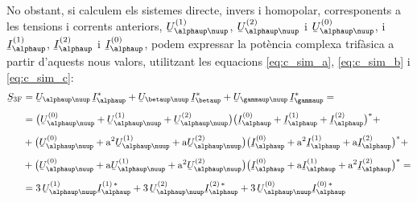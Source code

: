 No obstant, si calculem els sistemes directe, invers i homopolar,
corresponents a les tensions i corrents anteriors,
$\cmplx{U}_{\alphaup\nuup}\ap{(1)}$, $\cmplx{U}_{\alphaup\nuup}\ap{(2)}$ i
$\cmplx{U}_{\alphaup\nuup}\ap{(0)}$, i $\cmplx{I}_\alphaup\ap{(1)}$,
$\cmplx{I}_\alphaup\ap{(2)}$ i $\cmplx{I}_\alphaup\ap{(0)}$, podem
expressar la pot\`{e}ncia complexa trif\`{a}sica a partir d'aquests nous
valors, utilitzant les equacions \eqref{eq:c_sim_a},
\eqref{eq:c_sim_b} i \eqref{eq:c_sim_c}:
\begin{equation}
\begin{split}
   \cmplx{S}\ped{3F} &= \cmplx{U}_{\alphaup\nuup} \,\cmplx{I}_\alphaup^* +
   \cmplx{U}_{\betaup\nuup} \,\cmplx{I}_\betaup^* +  \cmplx{U}_{\gammaup\nuup} \,\cmplx{I}_\gammaup^* = \\[1ex]
   &= \big(\cmplx{U}_{\alphaup\nuup}^{(0)} + \cmplx{U}_{\alphaup\nuup}^{(1)} +
   \cmplx{U}_{\alphaup\nuup}^{(2)}\big) \big(\cmplx{I}_\alphaup^{(0)} + \cmplx{I}_\alphaup^{(1)} +
   \cmplx{I}_\alphaup^{(2)}\big)^* +  \\[1ex]
   &+ \big(\cmplx{U}_{\alphaup\nuup}^{(0)} + \au^2 \cmplx{U}_{\alphaup\nuup}^{(1)} +
   \au \cmplx{U}_{\alphaup\nuup}^{(2)} \big) \big(\cmplx{I}_\alphaup^{(0)} + \au^2 \cmplx{I}_\alphaup^{(1)}
    + \au \cmplx{I}_\alphaup^{(2)} \big)^* + \\[1ex]
   &+ \big(\cmplx{U}_{\alphaup\nuup}^{(0)} + \au \cmplx{U}_{\alphaup\nuup}^{(1)} + \au^2
   \cmplx{U}_{\alphaup\nuup}^{(2)} \big) \big(\cmplx{I}_\alphaup^{(0)} + \au
   \cmplx{I}_\alphaup^{(1)} + \au^2 \cmplx{I}_\alphaup^{(2)} \big)^* =  \\[1ex]
   &= 3\, \cmplx{U}_{\alphaup\nuup}^{(1)}  \cmplx{I}_\alphaup^{(1)\,*} +
   3\, \cmplx{U}_{\alphaup\nuup}^{(2)}  \cmplx{I}_\alphaup^{(2)\,*} +
   3\, \cmplx{U}_{\alphaup\nuup}^{(0)}  \cmplx{I}_\alphaup^{(0)\,*} \label{eq:c_sim_s}
\end{split}
\end{equation}

